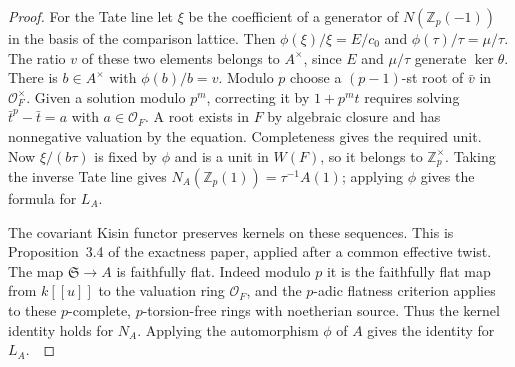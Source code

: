 \documentclass[a4paper,11pt]{article}
\theoremstyle{definition}
\theoremstyle{remark}
\newcommand{\ZZ}{\mathbb Z}\newcommand{\ord}{\operatorname{ord}}
\numberwithin{equation}{section}
\begin{document}
\begin{proof}
For the Tate line let \(\xi\) be the coefficient of a generator
of \(N(\ZZ_p(-1))\) in the basis of the comparison lattice.
Then \(\phi(\xi)/\xi=E/c_0\) and
\(\phi(\tau)/\tau=\mu/\tau\). The ratio \(v\) of these
two elements belongs to \(A^\times\), since \(E\) and
\(\mu/\tau\) generate \(\ker\theta\). There is \(b\in A^\times\)
with \(\phi(b)/b=v\). Modulo \(p\) choose a \((p-1)\)-st root
of \(\bar v\) in \(\mathcal O_F^\times\). Given a solution
modulo \(p^m\), correcting it by \(1+p^m t\) requires solving
\(\bar t^p-\bar t=a\) with \(a\in\mathcal O_F\). A root exists
in \(F\) by algebraic closure and has nonnegative valuation
by the equation. Completeness gives the required unit.
Now \(\xi/(b\tau)\) is fixed by \(\phi\) and is a unit in
\(W(F)\), so it belongs to \(\ZZ_p^\times\). Taking the
inverse Tate line gives \(N_A(\ZZ_p(1))=\tau^{-1}A(1)\);
applying \(\phi\) gives the formula for \(L_A\).

The covariant Kisin functor preserves kernels on these
sequences. This is Proposition~3.4 of the exactness paper,
applied after a common effective twist. The map
\(\mathfrak S\to A\) is faithfully flat. Indeed modulo \(p\)
it is the faithfully flat map from \(k[[u]]\) to the valuation
ring \(\mathcal O_F\), and the \(p\)-adic flatness criterion
applies to these \(p\)-complete, \(p\)-torsion-free rings with
noetherian source. Thus the kernel identity holds for \(N_A\).
Applying the automorphism \(\phi\) of \(A\) gives the identity
for \(L_A\).~\cite[Sections~2.1 and~3, Proposition~3.4]{III-II-cgmexact759}
\end{proof}
\end{document}
